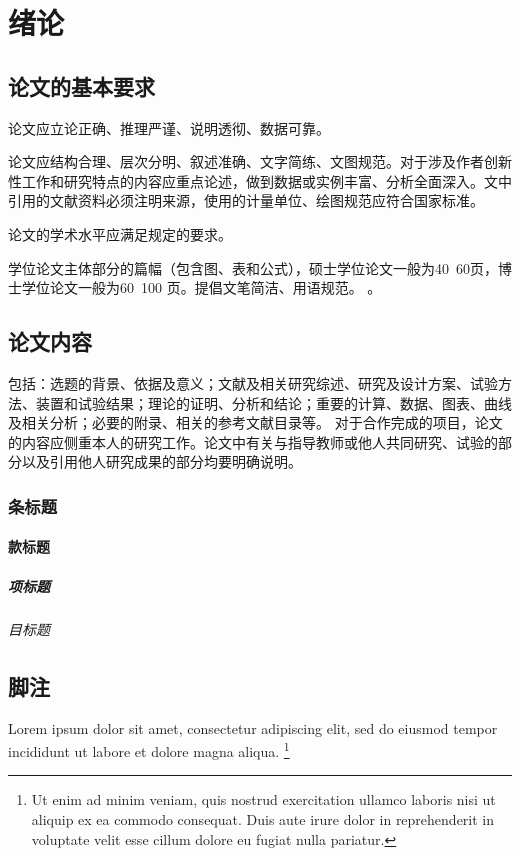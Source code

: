 
\chapter{绪论}
\section{论文的基本要求}
论文应立论正确、推理严谨、说明透彻、数据可靠。

论文应结构合理、层次分明、叙述准确、文字简练、文图规范。对于涉及作者创新性工作和研究特点的内容应重点论述，做到数据或实例丰富、分析全面深入。文中引用的文献资料必须注明来源，使用的计量单位、绘图规范应符合国家标准。

论文的学术水平应满足规定的要求。

学位论文主体部分的篇幅（包含图、表和公式），硕士学位论文一般为40~60页，博士学位论文一般为60~100 页。提倡文笔简洁、用语规范。
\cite{Taylor2008Medical,Pham2000Current}。
\section{论文内容}
包括：选题的背景、依据及意义；文献及相关研究综述、研究及设计方案、试验方法、装置和试验结果；理论的证明、分析和结论；重要的计算、数据、图表、曲线及相关分析；必要的附录、相关的参考文献目录等。
对于合作完成的项目，论文的内容应侧重本人的研究工作。论文中有关与指导教师或他人共同研究、试验的部分以及引用他人研究成果的部分均要明确说明。

\subsection{条标题}

\subsubsection{款标题}
\paragraph{项标题}

\subparagraph{目标题}




\section{脚注}
\label{section:footnote}

Lorem ipsum dolor sit amet, consectetur adipiscing elit, sed do eiusmod tempor
incididunt ut labore et dolore magna aliqua.
\footnote{Ut enim ad minim veniam, quis nostrud exercitation ullamco laboris
nisi ut aliquip ex ea commodo consequat.
Duis aute irure dolor in reprehenderit in voluptate velit esse cillum dolore
eu fugiat nulla pariatur.}

